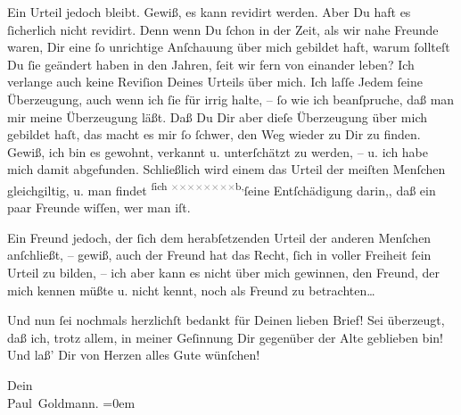 \pstart
           Ein Urteil jedoch bleibt. Gewiß, es kann revidirt werden. Aber Du haft es{ }ſicherlich
               nicht revidirt. Denn wenn Du{ }ſchon in der Zeit, als wir nahe Freunde waren, Dir eine{ }ſo unrichtige Anſchauung über mich {\pb}gebildet
               haft, warum{ }ſollteſt Du{ }ſie geändert haben in den Jahren,{ }ſeit wir fern von einander
               leben? Ich verlange auch keine Reviſion Deines Urteils über mich. Ich laſſe Jedem{ }ſeine Überzeugung, auch wenn ich{ }ſie für irrig halte, –{ }ſo wie ich beanſpruche, daß
               man mir meine Überzeugung läßt. Daß Du Dir aber dieſe Überzeugung über mich gebildet
               haſt, das macht es mir{ }ſo{ }ſchwer, den Weg wieder zu Dir zu finden. Gewiß, ich bin es
               gewohnt, verkannt u. unterſchätzt {\pb}zu werden, –
               u. ich habe mich damit abgefunden. Schließlich wird einem das Urteil der meiſten
               Menſchen gleichgiltig, u. man findet \substVorne{}\textsuperscript{ſich \textcolor{gray}{×}\-\textcolor{gray}{×}\-\textcolor{gray}{×}\-\textcolor{gray}{×}\-\textcolor{gray}{×}\-\textcolor{gray}{×}\-\textcolor{gray}{×}\-\textcolor{gray}{×}b,}\substDazwischen{}ſeine Entſchädigung darin,\substHinten{}, daß ein paar Freunde wiſſen, wer man iſt.\pend
           
\pstart
           Ein Freund jedoch,  der{ }ſich dem herabſetzenden Urteil der anderen Menſchen anſchließt, – gewiß,
               auch der Freund hat das Recht,{ }ſich in voller Freiheit{ }ſein Urteil zu bilden, – ich
               aber kann es nicht über mich {\pb}gewinnen, den
               Freund, der mich kennen müßte u. nicht kennt, noch als Freund zu betrachten{\dots}\pend
           
\pstart
           Und nun{ }ſei nochmals herzlichſt bedankt für Deinen lieben Brief! Sei überzeugt, daß
               ich, trotz allem, in meiner Geſinnung Dir gegenüber der Alte geblieben bin! Und laß’
               Dir von Herzen alles Gute wünſchen!\pend
           
\pstart
           Dein {\\[\baselineskip]}\spacefill\mbox{Paul Goldmann.}\pend
           \leftskip=0em{}\endnumbering{}  \newcommand{\dateiname}{L03478}\newcommand{\titel}{Paul Goldmann an Arthur Schnitzler, 16. 2. 1925}\newcommand{\editorInnen}{Martin Anton Müller und Laura Untner}

